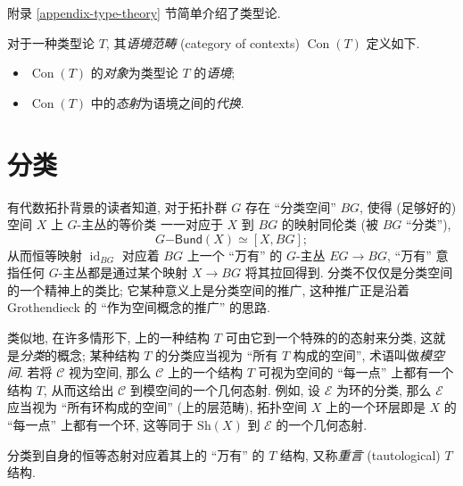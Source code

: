附录 \ref{appendix-type-theory} 节简单介绍了类型论.

\begin{definition}
	{}
	对于一种类型论 $T$, 其\emph{语境范畴} (category of contexts) $\operatorname{Con}(T)$ 定义如下.
	\begin{itemize}
		\item $\operatorname{Con}(T)$ 的\emph{对象}为类型论 $T$ 的\emph{语境};
		\item $\operatorname{Con}(T)$ 中的\emph{态射}为语境之间的\emph{代换}.
	\end{itemize}
\end{definition}

\section{分类\topos{}}


有代数拓扑背景的读者知道, 对于拓扑群 $G$ 存在 ``分类空间'' $BG$,
使得 (足够好的) 空间 $X$ 上 $G$-主丛的等价类
一一对应于 $X$ 到 $BG$ 的映射同伦类 (被 $BG$ ``分类''),
$$
G\mathsf{-Bund} (X) \simeq [X,BG];
$$
从而恒等映射 $\operatorname{id}_{BG}$ 对应着 $BG$ 上一个 ``万有'' 的 $G$-主丛 $EG \to BG$,
``万有'' 意指任何 $G$-主丛都是通过某个映射 $X \to BG$ 将其拉回得到.
分类\topos{}不仅仅是分类空间的一个精神上的类比; 它某种意义上是分类空间的推广, 这种推广正是沿着 Grothendieck 的 ``\topos{}作为空间概念的推广'' 的思路.

类似地, 在许多情形下, \topos{}上的一种结构 $T$ 可由它到一个特殊的\topos{}的态射来分类, 这就是\emph{分类\topos{}}的概念;
某种结构 $T$ 的分类\topos{}应当视为 ``所有 $T$ 构成的空间'', 术语叫做\emph{模空间}.
若将\topos{} $\mathcal C$ 视为空间, 那么 $\mathcal C$ 上的一个结构 $T$ 可视为空间的 ``每一点'' 上都有一个结构 $T$,
从而这给出 $\mathcal C$ 到模空间的一个几何态射.
例如, 设 $\mathcal E$ 为环的分类\topos{}, 那么 $\mathcal E$ 应当视为 ``所有环构成的空间'' (上的层范畴), 拓扑空间 $X$ 上的一个环层即是 $X$ 的 ``每一点'' 上都有一个环,
这等同于 $\text{Sh}(X)$ 到 $\mathcal E$ 的一个几何态射.

分类\topos{}到自身的恒等态射对应着其上的 ``万有'' 的 $T$ 结构, 又称\emph{重言} (tautological) $T$ 结构.

